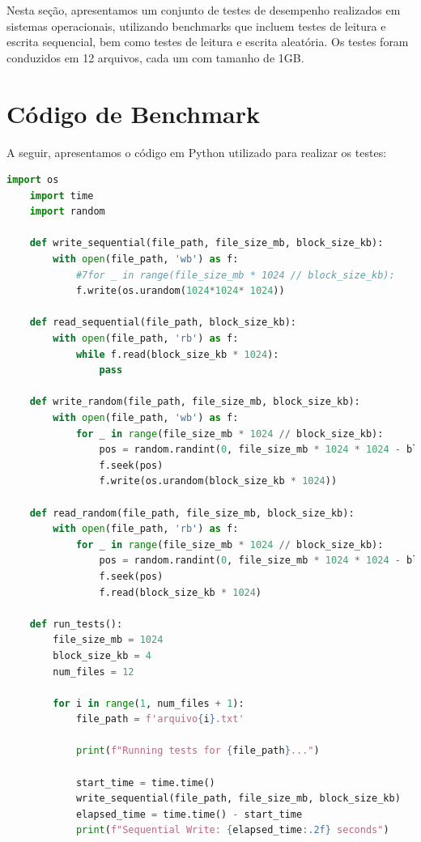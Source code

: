 \documentclass[
	12pt,				%
	openright,			%
	oneside,			%
	a4paper,			%
	chapter=TITLE,		%
	english,			%
	french,				%
	spanish,			%
	brazil				%
	]{abntex2}
\theoremstyle{definition}
\begin{document}
\lstset{style=dracula}




Nesta seção, apresentamos um conjunto de testes de desempenho realizados em 
sistemas operacionais, utilizando benchmarks que incluem testes de leitura e 
escrita sequencial, bem como testes de leitura e escrita aleatória. Os testes 
foram conduzidos em 12 arquivos, cada um com tamanho de 1GB.

\section{Código de Benchmark}

A seguir, apresentamos o código em Python utilizado para realizar os testes:

\begin{lstlisting}[language=Python, caption=
	{Código de Benchmark. 
	\href{https://github.com/jvictorferreira3301/Sistemas_Operacionais/blob/main/6_ext4/benchmark_ext4.py}{github.com/jvictorferreira3301/SistemasOperacionais
	/blob/main/6\_ext4/benchmark\_ext4.py}}, label=benchmark_code]
	import os
	import time
	import random
	
	def write_sequential(file_path, file_size_mb, block_size_kb):
		with open(file_path, 'wb') as f:
			#7for _ in range(file_size_mb * 1024 // block_size_kb):
			f.write(os.urandom(1024*1024* 1024))
	
	def read_sequential(file_path, block_size_kb):
		with open(file_path, 'rb') as f:
			while f.read(block_size_kb * 1024):
				pass
	
	def write_random(file_path, file_size_mb, block_size_kb):
		with open(file_path, 'wb') as f:
			for _ in range(file_size_mb * 1024 // block_size_kb):
				pos = random.randint(0, file_size_mb * 1024 * 1024 - block_size_kb * 1024)
				f.seek(pos)
				f.write(os.urandom(block_size_kb * 1024))
	
	def read_random(file_path, file_size_mb, block_size_kb):
		with open(file_path, 'rb') as f:
			for _ in range(file_size_mb * 1024 // block_size_kb):
				pos = random.randint(0, file_size_mb * 1024 * 1024 - block_size_kb * 1024)
				f.seek(pos)
				f.read(block_size_kb * 1024)
	
	def run_tests():
		file_size_mb = 1024
		block_size_kb = 4
		num_files = 12
	
		for i in range(1, num_files + 1):
			file_path = f'arquivo{i}.txt'
	
			print(f"Running tests for {file_path}...")
			
			start_time = time.time()
			write_sequential(file_path, file_size_mb, block_size_kb)
			elapsed_time = time.time() - start_time
			print(f"Sequential Write: {elapsed_time:.2f} seconds")
	

\end{lstlisting}
\end{document}

